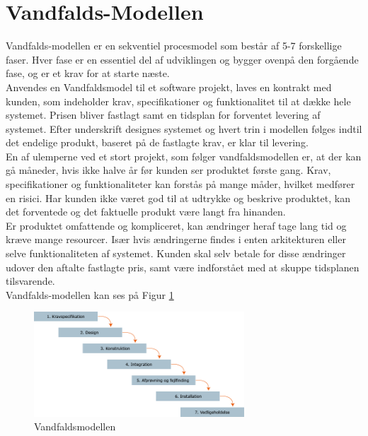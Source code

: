 \section{Vandfalds-Modellen}\label{sec:vandfald}
Vandfalds-modellen er en sekventiel procesmodel som består 
af 5-7 forskellige faser. Hver fase er en essentiel del af udviklingen
og bygger ovenpå den forgående fase, og er et krav for at starte næste.\\

Anvendes en Vandfaldsmodel til et software projekt, laves en kontrakt med
kunden, som indeholder krav, specifikationer og funktionalitet til at 
dække hele systemet. Prisen bliver fastlagt samt en tidsplan for forventet
levering af systemet. Efter underskrift designes systemet og hvert trin i 
modellen følges indtil det endelige produkt, baseret på de fastlagte krav,
er klar til levering.\\

En af ulemperne ved et stort projekt, som følger vandfaldsmodellen er, 
at der kan gå måneder, hvis ikke halve år før kunden ser produktet første gang.
Krav, specifikationer og funktionaliteter kan forstås på mange måder, hvilket
medfører en risici. Har kunden ikke været god til at udtrykke og beskrive 
produktet, kan det forventede og det faktuelle produkt være langt fra 
hinanden.\\

Er produktet omfattende og kompliceret, kan ændringer heraf tage
lang tid og kræve mange resourcer. Især hvis ændringerne findes i enten 
arkitekturen eller selve funktionaliteten af systemet. 
Kunden skal selv betale for disse ændringer udover den aftalte fastlagte 
pris, samt være indforstået med at skuppe tidsplanen tilsvarende.\\
  
Vandfalds-modellen kan ses på Figur \ref{fig:waterfallmodel} \\


\begin{figure}[H]
    \centering
    \includegraphics[width=0.7\textwidth]{figures/waterfall.png}
    \caption{Vandfaldsmodellen \cite{WaterfallModel}}
    \label{fig:waterfallmodel}
\end{figure}

